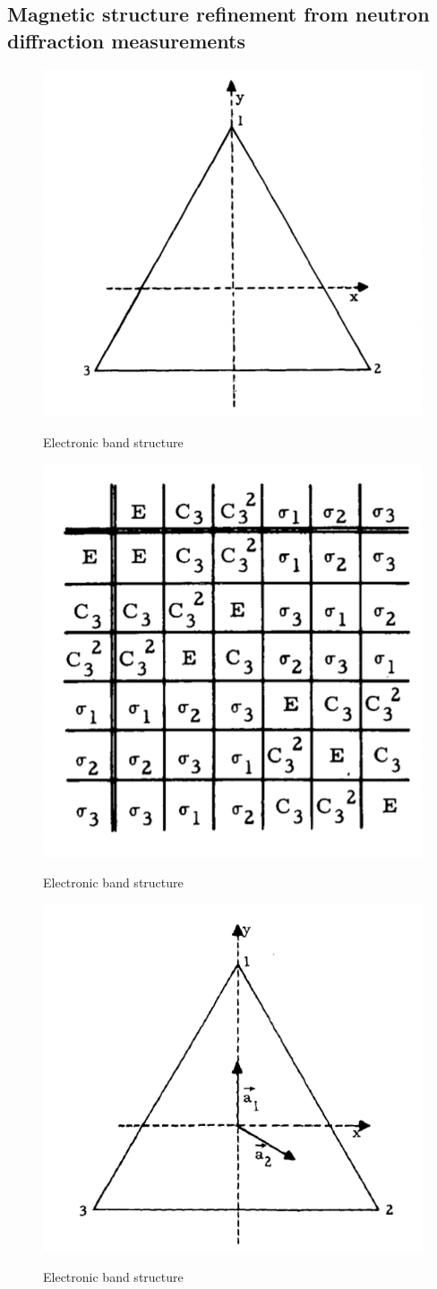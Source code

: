 \documentclass[10pt,doublespacing,edeposit]{uiucthesis2020}
\begin{document}
\begin{mainmatter}


\chapter{Magnetic structure refinement from neutron diffraction measurements}

\begin{figure}
\centering\includegraphics[width=0.5\columnwidth]{figures/ch4/C3v.png} \\
\caption{\label{fig:C3v}
Electronic band structure
}
\end{figure}

\begin{figure}
\centering\includegraphics[width=0.5\columnwidth]{figures/ch4/group_multiplication_table_C3v.png} \\
\caption{\label{fig:gmt_C3v}
Electronic band structure
}
\end{figure}

\begin{figure}
\centering\includegraphics[width=0.5\columnwidth]{figures/ch4/C3v_a1_a2.png} \\
\caption{\label{fig:C3v_a1_a2}
Electronic band structure
}
\end{figure}


\end{mainmatter}
\end{document}
